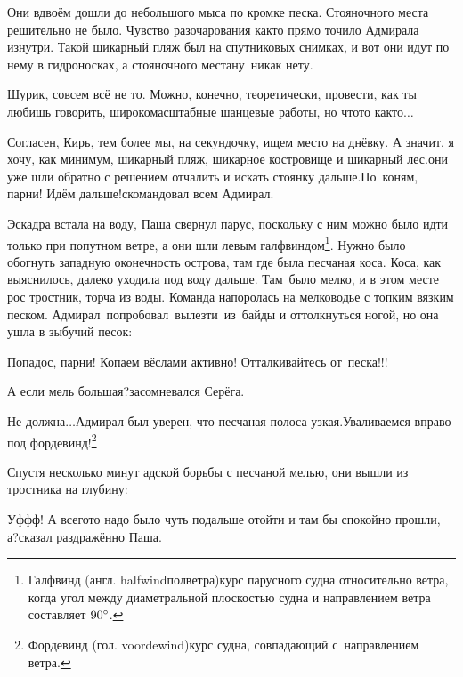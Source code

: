Они вдвоём дошли до небольшого мыса по кромке песка. Стояночного места решительно не было. Чувство разочарования как\sdash то прямо точило Адмирала изнутри. Такой шикарный пляж был на спутниковых снимках, и вот они идут по нему в гидроносках, а стояночного места\mdash ну~никак нету.

\diagdash Шурик, совсем всё не то. Можно, конечно, теоретически, провести, как ты любишь говорить, широкомасштабные шанцевые работы, но что\sdash то как\sdash то$\ldots$

\diagdash Согласен, Кирь, тем более мы, на секундочку, ищем место на днёвку. А значит, я хочу, как минимум, шикарный пляж, шикарное костровище и шикарный лес.\mdash они уже шли обратно с решением отчалить и искать стоянку дальше.\mdash По~коням, парни! Идём дальше!\mdash скомандовал всем Адмирал.

\renewcommand*{\thefootnote}{\arabic{footnote}}
\setcounter{footnote}{0}
Эскадра встала на воду, Паша свернул парус, поскольку с ним можно было идти только при попутном ветре, а они шли левым галфвиндом\footnote{Галфвинд (англ. halfwind\mdash полветра)\mdash курс парусного судна относительно ветра, когда угол между диаметральной плоскостью судна и направлением ветра составляет $90\degree$.}. Нужно было обогнуть западную оконечность острова, там где была песчаная коса. Коса, как выяснилось, далеко уходила под воду дальше. Там~было мелко, и в этом месте рос тростник, торча из воды. Команда напоролась на мелководье с топким вязким песком. Адмирал~попробовал~вылезти~из~байды и оттолкнуться ногой, но она ушла в зыбучий песок:

\diagdash Попадос, парни! Копаем вёслами активно! Отталкивайтесь от~песка!!!

\diagdash А если мель большая?\mdash засомневался Серёга.

\diagdash Не должна$\ldots$\mdash Адмирал был уверен, что песчаная полоса узкая.\mdash Уваливаемся вправо под фордевинд!\footnote{Фордевинд (гол. voordewind)\mdash курс судна, совпадающий с~направлением ветра.}

Спустя несколько минут адской борьбы с песчаной мелью, они вышли из тростника на глубину:

\diagdash Уф\sdash ф\sdash ф! А всего\sdash то надо было чуть подальше отойти и там бы спокойно прошли, а?\mdash сказал раздражённо Паша.

